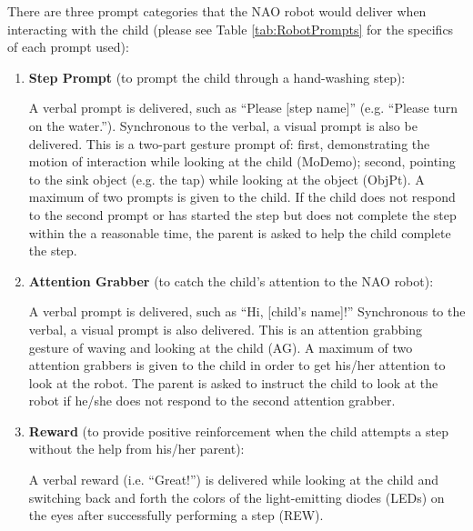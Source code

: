 \documentclass{ut-thesis}
\begin{document}
There are three prompt categories that the NAO robot would deliver when interacting with the child (please see Table \ref{tab:RobotPrompts} for the specifics of each prompt used):
\begin{enumerate}
	\item \textbf{Step Prompt} (to prompt the child through a hand-washing step):

	A verbal prompt is delivered, such as “Please [step name]” (e.g. “Please turn on the water.”).  Synchronous to the verbal, a visual prompt is also be delivered. This is a two-part gesture prompt of: first, demonstrating the motion of interaction while looking at the child (MoDemo); second, pointing to the sink object (e.g. the tap) while looking at the object (ObjPt). A maximum of two prompts is given to the child. If the child does not respond to the second prompt or has started the step but does not complete the step within the a reasonable time, the parent is asked to help the child complete the step. 

	\item \textbf{Attention Grabber} (to catch the child's attention to the NAO robot): 

	A verbal prompt is delivered, such as “Hi, [child's name]!”  Synchronous to the verbal, a visual prompt is also delivered. This is an attention grabbing gesture of waving and looking at the child (AG). A maximum of two attention grabbers is given to the child in order to get his/her attention to look at the robot.  The parent is asked to instruct the child to look at the robot if he/she does not respond to the second attention grabber. 

	\item \textbf{Reward} (to provide positive reinforcement when the child attempts a step without the help from his/her parent): 

	A verbal reward (i.e. “Great!”) is delivered while looking at the child and switching back and forth the colors of the light-emitting diodes (LEDs) on the eyes after successfully performing a step (REW).
\end{enumerate}
\end{document}
